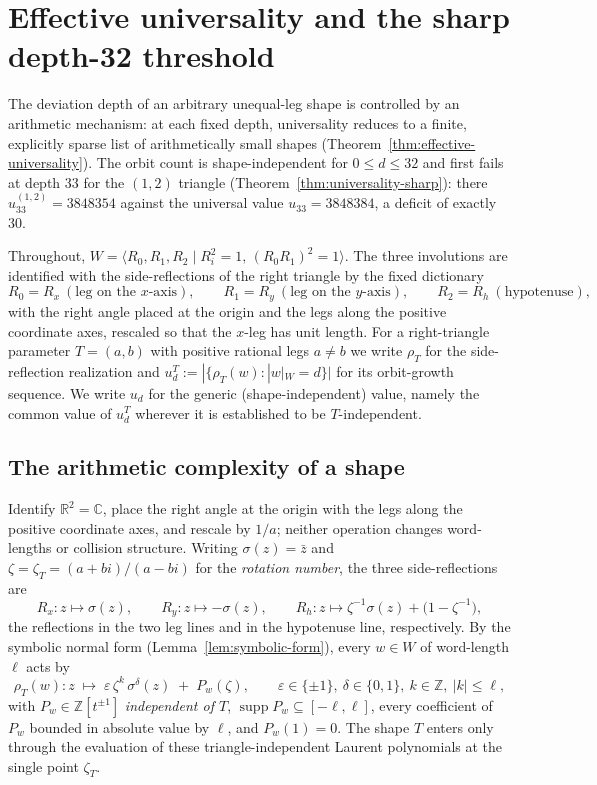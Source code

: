 \documentclass[11pt]{article}
\theoremstyle{plain}
\theoremstyle{definition}
\theoremstyle{remark}
\begin{document}
\section{Effective universality and the sharp depth-32 threshold}
\label{sec:effective-universality}

The deviation depth of an arbitrary unequal-leg shape is controlled by
an arithmetic mechanism: at each fixed depth, universality reduces to a
finite, explicitly sparse list of arithmetically small shapes
(Theorem~\ref{thm:effective-universality}). The orbit count is
shape-independent for $0 \le d \le 32$ and first fails at depth $33$ for
the $(1,2)$ triangle (Theorem~\ref{thm:universality-sharp}): there
$u_{33}^{(1,2)} = 3848354$ against the universal value $u_{33} = 3848384$,
a deficit of exactly $30$.

Throughout, $W = \langle R_0, R_1, R_2 \mid R_i^2 = 1,\,
(R_0R_1)^2 = 1\rangle$. The three involutions are identified with the
side-reflections of the right triangle by the fixed dictionary
\[
R_0 = R_x \ (\text{leg on the $x$-axis}), \qquad
R_1 = R_y \ (\text{leg on the $y$-axis}), \qquad
R_2 = R_h \ (\text{hypotenuse}),
\]
with the right angle placed at the origin and the legs along the
positive coordinate axes, rescaled so that the $x$-leg has unit length.
For a right-triangle parameter $T = (a,b)$ with positive rational legs
$a \ne b$ we write $\rho_T$ for the side-reflection realization and
$u_d^T := |\{\rho_T(w) : |w|_W = d\}|$ for its orbit-growth sequence.
We write $u_d$ for the generic (shape-independent) value, namely the
common value of $u_d^T$ wherever it is established to be
$T$-independent.

\subsection{The arithmetic complexity of a shape}

Identify $\mathbb{R}^2 = \mathbb{C}$, place the right angle at the
origin with the legs along the positive coordinate axes, and rescale by
$1/a$; neither operation changes word-lengths or collision structure.
Writing $\sigma(z) = \bar z$ and
$\zeta = \zeta_T = (a+bi)/(a-bi)$ for the \emph{rotation number}, the
three side-reflections are
\[
R_x : z \mapsto \sigma(z), \qquad
R_y : z \mapsto -\sigma(z), \qquad
R_h : z \mapsto \zeta^{-1}\sigma(z) + \bigl(1 - \zeta^{-1}\bigr),
\]
the reflections in the two leg lines and in the hypotenuse line,
respectively. By the symbolic normal form (Lemma~\ref{lem:symbolic-form}),
every $w \in W$ of word-length $\ell$ acts by
\[
\rho_T(w)\colon z \;\longmapsto\;
\varepsilon\, \zeta^{k}\, \sigma^{\delta}(z) \;+\; P_w(\zeta),
\qquad
\varepsilon \in \{\pm 1\},\ \delta \in \{0,1\},\ k \in \mathbb{Z},\ |k| \le \ell,
\]
with $P_w \in \mathbb{Z}[t^{\pm 1}]$ \emph{independent of $T$},
$\operatorname{supp} P_w \subseteq [-\ell,\ell]$, every coefficient of
$P_w$ bounded in absolute value by $\ell$, and $P_w(1) = 0$. The shape
$T$ enters only through the evaluation of these triangle-independent
Laurent polynomials at the single point $\zeta_T$.
\end{document}
